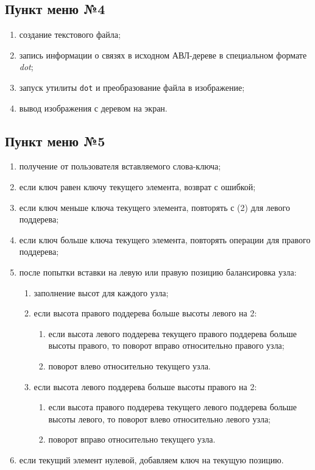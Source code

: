 \documentclass[a4paper,12pt]{extarticle}
\begin{document}
\subsection{Пункт меню №4}
\begin{enumerate}
    \item создание текстового файла;
    \item запись информации о связях в исходном АВЛ-дереве в специальном формате \textit{dot};
    \item запуск утилиты \texttt{dot} и преобразование файла в изображение;
    \item вывод изображения с деревом на экран.
\end{enumerate}

\subsection{Пункт меню №5}
\begin{enumerate}
	\item получение от пользователя вставляемого слова-ключа;
   	\item если ключ равен ключу текущего элемента, возврат с ошибкой;
   	\item если ключ меньше ключа текущего элемента, повторять с (2) для левого поддерева;
   	\item если ключ больше ключа текущего элемента, повторять операции для правого поддерева;
   	\item после попытки вставки на левую или правую позицию балансировка узла:
   	\begin{enumerate}
   		\item заполнение высот для каждого узла;
   		\item если высота правого поддерева больше высоты левого на 2:
   		
   		\begin{enumerate}
   		\item если высота левого поддерева текущего правого поддерева больше высоты правого, то поворот вправо относительно правого узла;
   		\item поворот влево относительно текущего узла.
   		\end{enumerate}
   		
   		\item если высота левого поддерева больше высоты правого на 2:
   		
   		\begin{enumerate}
   		\item если высота правого поддерева текущего левого поддерева больше высоты левого, то поворот влево относительно левого узла;
   		\item поворот вправо относительно текущего узла.
   	\end{enumerate}
   	\end{enumerate}
   	\item если текущий элемент нулевой, добавляем ключ на текущую позицию.
\end{enumerate}
\end{document}
